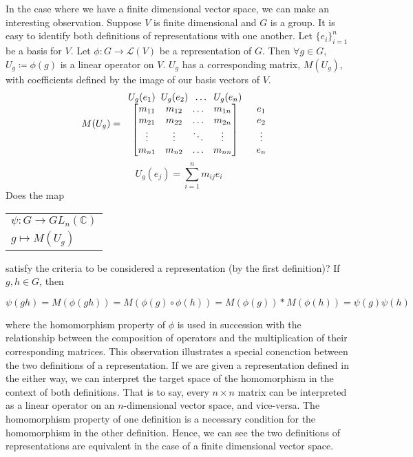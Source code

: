 \begin{remark}
	In the case where we have a finite dimensional vector space, we can make an interesting observation. Suppose $V$ is finite dimensional and $G$ is a group. It is easy to identify both definitions of representations with one another. Let $\{e_i\}_{i=1}^n$ be a basis for $V$. Let $\phi : G \rightarrow \mathcal{L}(V)$ be a representation of $G$. Then $\forall g \in G$, $U_g\coloneq\phi(g)$ is a linear operator on $V$. $U_g$ has a corresponding matrix, $M(U_g)$, with coefficients defined by the image of our basis vectors of $V$.
$$M(U_g) = \begin{array}{c c}
			U_g(e_1) \hspace{2mm} U_g(e_2) \hspace{2mm} \hdots \hspace{2mm}  U_g(e_n) & \\
			\begin{bmatrix}
				m_{11} & m_{12} & \hdots & m_{1n}\\
				m_{21} & m_{22} & \hdots & m_{2n} \\
				\vdots & \vdots & \ddots & \vdots\\
				m_{n1} & m_{n2} & \hdots & m_{nn}\\
			\end{bmatrix}
			&
			\begin{array}{c}
				e_1\\
				e_2\\
				\vdots\\
				e_n\\
			\end{array}
		\end{array}$$
$$U_g(e_j) = \sum_{i=1}^n m_{ij}e_i$$
\renewcommand{\arraystretch}{0.5}
Does the map \begin{tabular}{l}
			$\psi:G\rightarrow GL_n(\mathbb{C})$\\
			\hspace{6mm}$g\mapsto M(U_g)$
       		 \end{tabular}
satisfy the criteria to be considered a representation (by the first definition)? If $g,h \in G$, then

	$$\psi(gh) = M(\phi(gh)) = M(\phi(g)\circ \phi(h)) = M(\phi(g))*M(\phi(h)) = \psi(g)\psi(h)$$

\noindent where the homomorphism property of $\phi$ is used in succession with the relationship between the composition of operators and the multiplication of their corresponding matrices. This observation illustrates a special conenction between the two definitions of a representation. If we are given a representation defined in the either way, we can interpret the target space of the homomorphism in the context of both definitions. That is to say, every $n\times n$ matrix can be interpreted as a linear operator on an $n$-dimensional vector space, and vice-versa. The homomorphism property of one definition is a necessary condition for the homomorphism in the other definition. Hence, we can see the two definitions of representations are equivalent in the case of a finite dimensional vector space.
\end{remark}

